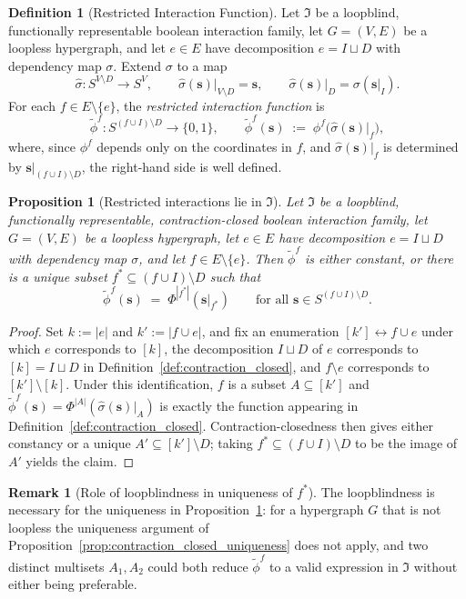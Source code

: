 \documentclass[11pt,reqno]{amsart}
\newcommand{\vecs}{\boldsymbol{s}}
\newcommand{\IFam}{\mathfrak{I}}
\theoremstyle{plain}
\newtheorem{proposition}[theorem]{Proposition}
\theoremstyle{definition}
\newtheorem{definition}[theorem]{Definition}
\newtheorem{remark}[theorem]{Remark}
\numberwithin{equation}{section}
\begin{document}
\begin{definition}[Restricted Interaction Function]
\label{def:restricted_interaction}
Let $\IFam$ be a loopblind, functionally representable boolean interaction family, let $G = (V,E)$ be a loopless hypergraph, and let $e \in E$ have decomposition $e = I \sqcup D$ with dependency map $\sigma$. Extend $\sigma$ to a map
\[
    \hat\sigma \colon S^{V \setminus D} \longrightarrow S^{V},
    \qquad
    \hat\sigma(\vecs)\big|_{V \setminus D} = \vecs,
    \qquad
    \hat\sigma(\vecs)\big|_{D} = \sigma(\vecs|_I).
\]
For each $f \in E \setminus \{e\}$, the \emph{restricted interaction function} is
\[
    \widetilde\phi^f \colon S^{(f \cup I) \setminus D} \longrightarrow \{0,1\},
    \qquad
    \widetilde\phi^f(\vecs) \;:=\; \phi^f\!\big(\hat\sigma(\vecs)|_f\big),
\]
where, since $\phi^f$ depends only on the coordinates in $f$, and $\hat\sigma(\vecs)|_f$ is determined by $\vecs|_{(f \cup I) \setminus D}$, the right-hand side is well defined.
\end{definition}

\begin{proposition}[Restricted interactions lie in $\IFam$]
\label{prop:restricted_in_class}
Let $\IFam$ be a loopblind, functionally representable, contraction-closed boolean interaction family, let $G = (V,E)$ be a loopless hypergraph, let $e \in E$ have decomposition $e = I \sqcup D$ with dependency map $\sigma$, and let $f \in E \setminus \{e\}$. Then $\widetilde\phi^f$ is either constant, or there is a unique subset $f^* \subseteq (f \cup I) \setminus D$ such that
\[
    \widetilde\phi^f(\vecs) \;=\; \Phi^{|f^*|}(\vecs|_{f^*})
    \qquad \text{for all } \vecs \in S^{(f \cup I) \setminus D}.
\]
\end{proposition}
\begin{proof}
Set $k := |e|$ and $k' := |f \cup e|$, and fix an enumeration $[k'] \leftrightarrow f \cup e$ under which $e$ corresponds to $[k]$, the decomposition $I \sqcup D$ of $e$ corresponds to $[k] = I \sqcup D$ in Definition~\ref{def:contraction_closed}, and $f \setminus e$ corresponds to $[k'] \setminus [k]$. Under this identification, $f$ is a subset $A \subseteq [k']$ and $\widetilde\phi^f(\vecs) = \Phi^{|A|}(\hat\sigma(\vecs)|_A)$ is exactly the function appearing in Definition~\ref{def:contraction_closed}. Contraction-closedness then gives either constancy or a unique $A' \subseteq [k'] \setminus D$; taking $f^* \subseteq (f \cup I) \setminus D$ to be the image of $A'$ yields the claim.
\end{proof}
\begin{remark}[Role of loopblindness in uniqueness of $f^*$]
\label{rem:loopblind_uniqueness}
The loopblindness is necessary for the uniqueness in Proposition~\ref{prop:restricted_in_class}: for a hypergraph $G$ that is not loopless the uniqueness argument of Proposition~\ref{prop:contraction_closed_uniqueness} does not apply, and two distinct multisets $A_1, A_2$ could both reduce $\widetilde\phi^f$ to a valid expression in $\IFam$ without either being preferable.
\end{remark}
\end{document}
